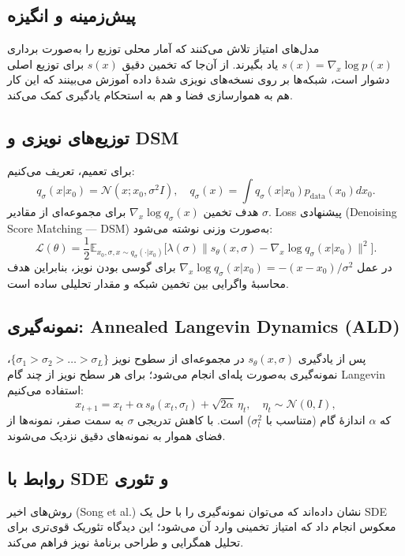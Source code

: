 \subsection{پیش‌زمینه و انگیزه}
مدل‌های امتیاز تلاش می‌کنند که آمار محلی توزیع را به‌صورت برداری \(s(x)=\nabla_x \log p(x)\) یاد بگیرند. از آن‌جا که تخمین دقیق \(s(x)\) برای توزیع اصلی دشوار است، شبکه‌ها بر روی نسخه‌های نویزی شدهٔ داده آموزش می‌بینند که این کار هم به هموارسازی فضا و هم به استحکام یادگیری کمک می‌کند.

\subsection{توزیع‌های نویزی و DSM}
برای تعمیم، تعریف می‌کنیم:
\begin{equation}
q_\sigma(x|x_0)=\mathcal{N}(x; x_0, \sigma^2 I),\quad q_\sigma(x)=\int q_\sigma(x|x_0)p_{\text{data}}(x_0)dx_0.
\end{equation}
هدف تخمین \(\nabla_x \log q_\sigma(x)\) برای مجموعه‌ای از مقادیر \(\sigma\). Loss پیشنهادی (Denoising Score Matching — DSM) به‌صورت وزنی نوشته می‌شود:
\begin{equation}\label{eq:dsm}
\mathcal{L}(\theta)=\frac{1}{2} \mathbb{E}_{x_0,\sigma, x\sim q_\sigma(\cdot|x_0)}\big[\lambda(\sigma) \| s_\theta(x,\sigma) - \nabla_x \log q_\sigma(x|x_0) \|^2\big].
\end{equation}
در عمل \(\nabla_x \log q_\sigma(x|x_0) = -(x - x_0)/\sigma^2\) برای گوسی بودن نویز، بنابراین هدف محاسبهٔ واگرایی بین تخمین شبکه و مقدار تحلیلی ساده است.

\subsection{نمونه‌گیری: Annealed Langevin Dynamics (ALD)}
پس از یادگیری \(s_\theta(x,\sigma)\) در مجموعه‌ای از سطوح نویز \(\{\sigma_1 > \sigma_2 > \dots > \sigma_L\}\)، نمونه‌گیری به‌صورت پله‌ای انجام می‌شود؛ برای هر سطح نویز از چند گام Langevin استفاده می‌کنیم:
\begin{equation}
x_{t+1} = x_t + \alpha\, s_\theta(x_t, \sigma_l) + \sqrt{2\alpha}\,\eta_t,\quad \eta_t\sim\mathcal{N}(0,I),
\end{equation}
که \(\alpha\) اندازهٔ گام (متناسب با \(\sigma_l^2\)) است. با کاهش تدریجی \(\sigma\) به سمت صفر، نمونه‌ها از فضای هموار به نمونه‌های دقیق نزدیک می‌شوند.

\subsection{روابط با SDE و تئوری}
روش‌های اخیر (Song et al.) نشان داده‌اند که می‌توان نمونه‌گیری را با حل یک SDE معکوس انجام داد که امتیاز تخمینی وارد آن می‌شود؛ این دیدگاه تئوریک قوی‌تری برای تحلیل همگرایی و طراحی برنامهٔ نویز فراهم می‌کند.


